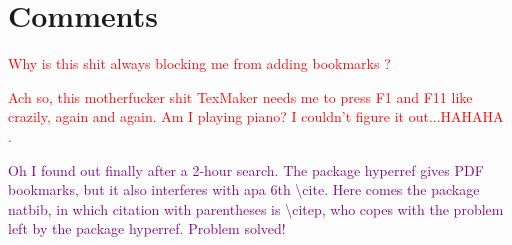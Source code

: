 \documentclass[jou]{apa6}
\begin{document}
\section{Comments}
\textcolor{red}{
Why is this shit always blocking me from adding bookmarks \citep{studzinska2017atranorin}?}

\textcolor{red}{
Ach so, this motherfucker shit TexMaker needs me to press F1 and F11 like crazily, again and again. Am I playing piano? I couldn't figure it out...HAHAHA \citep{streur2018don}.}

\textcolor{purple}{
Oh I found out finally after a 2-hour search. The package hyperref gives PDF bookmarks, but it also interferes with apa 6th \textbackslash cite. Here comes the package natbib, in which citation with parentheses is \textbackslash citep, who copes with the problem left by  the package hyperref. Problem solved!}
\end{document}
